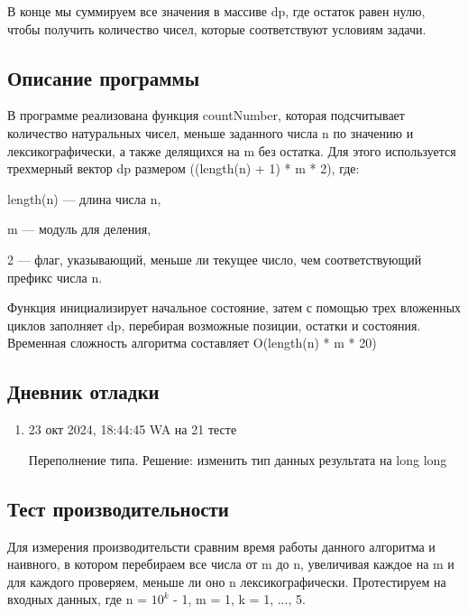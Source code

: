 \documentclass[12pt]{article}
\begin{document}
В конце мы суммируем все значения в массиве dp, где остаток равен нулю, чтобы получить количество чисел, которые соответствуют условиям задачи.

\subsection*{Описание программы}

В программе реализована функция countNumber, которая подсчитывает количество натуральных чисел, меньше заданного числа n по значению и лексикографически, а также делящихся на m без остатка. Для этого используется трехмерный вектор dp размером ((length(n) + 1) * m * 2), где:

length(n) — длина числа n,

m — модуль для деления,

2 — флаг, указывающий, меньше ли текущее число, чем соответствующий префикс числа n.

Функция инициализирует начальное состояние, затем с помощью трех вложенных циклов заполняет dp, перебирая возможные позиции, остатки и состояния. Временная сложность алгоритма составляет O(length(n) * m * 20)

\subsection*{Дневник отладки}

\begin{enumerate}
    \item 23 окт 2024, 18:44:45 WA на 21 тесте
		
    Переполнение типа. Решение: изменить тип данных результата на long long 


\end{enumerate}

\subsection*{Тест производительности}

Для измерения производительсти сравним время работы данного алгоритма и наивного, в котором перебираем все числа от m до n, увеличивая каждое на m и  для каждого проверяем, меньше ли оно n лексикографически. Протестируем на входных данных, где n = $10^k$ - 1, m = 1, k = 1, ..., 5.
	
\end{document}

